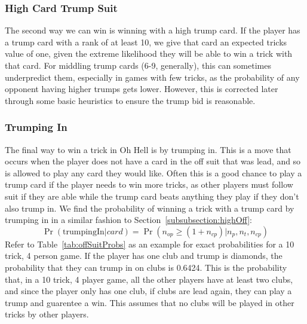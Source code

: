 \documentclass{article}
\begin{document}
\subsubsection{High Card Trump Suit}
\label{subsubsection:highTrump}
The second way we can win is winning with a high trump card. If the player has a trump card with a rank of at least 10, we give that card an expected tricks value of one, given the extreme likelihood they will be able to win a trick with that card. For middling trump cards (6-9, generally), this can sometimes underpredict them, especially in games with few tricks, as the probability of any opponent having higher trumps gets lower. However, this is corrected later through some basic heuristics to ensure the trump bid is reasonable.
\subsubsection{Trumping In}
\label{subsubsection:trumpingIn}
The final way to win a trick in Oh Hell is by trumping in. This is a move that occurs when the player does not have a card in the off suit that was lead, and so is allowed to play any card they would like. Often this is a good chance to play a trump card if the player needs to win more tricks, as other players must follow suit if they are able while the trump card beats anything they play if they don't also trump in. 
We find the probability of winning a trick with a trump card by trumping in in a similar fashion to Section~\ref{subsubsection:highOff}:
$$\Pr(\text{trumpingIn}|\textit{card}) = \Pr(n_{op} \geq (1+n_{cp})|n_p,n_t,n_{cp})$$
Refer to Table~\ref{tab:offSuitProbs} as an example for exact probabilities for a 10 trick, 4 person game. If the player has one club and trump is diamonds, the probability that they can trump in on clubs is 0.6424. This is the probability that, in a 10 trick, 4 player game, all the other players have at least two clubs, and since the player only has one club, if clubs are lead again, they can play a trump and guarentee a win. This assumes that no clubs will be played in other tricks by other players.
\end{document}
